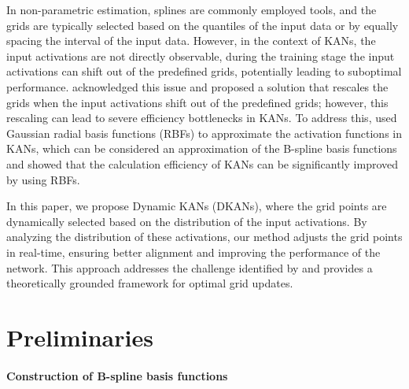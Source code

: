 \documentclass[11pt]{scrartcl}
\begin{document}
In non-parametric estimation, splines are commonly employed tools, and the grids are typically selected based on the quantiles of the input data or by equally spacing the interval of the input data.
However, in the context of KANs, the input activations are not directly observable, during the training stage the input activations can shift out of the predefined grids, potentially leading to suboptimal performance.
\citet{liu2024kan} acknowledged this issue and proposed a solution that rescales the grids when the input activations shift out of the predefined grids; however, this rescaling can lead to severe efficiency bottlenecks in KANs.
To address this, \citet{li2024kolmogorov} used Gaussian radial basis functions (RBFs) to approximate the activation functions in KANs, which can be considered an approximation of the B-spline basis functions and showed that the calculation efficiency of KANs can be significantly improved by using RBFs.

In this paper, we propose Dynamic KANs (DKANs), where the grid points are dynamically selected based on the distribution of the input activations. By analyzing the distribution of these activations, our method adjusts the grid points in real-time, ensuring better alignment and improving the performance of the network. This approach addresses the challenge identified by \citet{liu2024kan} and provides a theoretically grounded framework for optimal grid updates.

\section{Preliminaries}

\paragraph*{Construction of B-spline basis functions}
\end{document}
